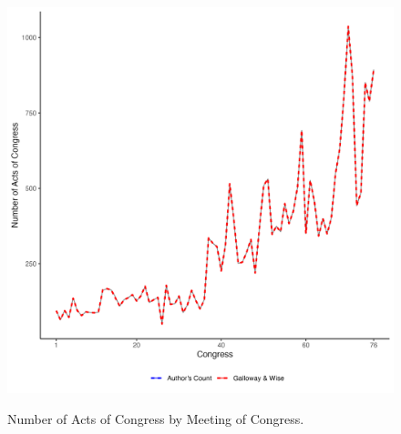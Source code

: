 \documentclass[fleqn,10pt]{wlscirep}
\begin{document}
\begin{figure}[h]
  \centering
  \caption{Number of Acts of Congress by Meeting of Congress.}
  \includegraphics[width=\linewidth]{draft/figures/counts_of_laws.png}
    \label{fig:totals}
\end{figure}




\end{document}
